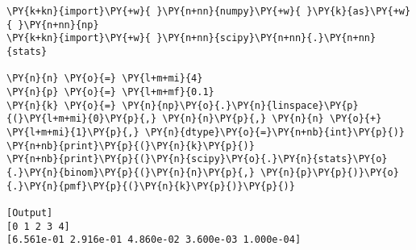 \begin{Verbatim}[label=\makebox{\href{https://github.com/unipi-physics-labs/statnotes/tree/main/snippy/scipy.stats.binom.py}{https://github.com/.../scipy.stats.binom.py}},commandchars=\\\{\}]
\PY{k+kn}{import}\PY{+w}{ }\PY{n+nn}{numpy}\PY{+w}{ }\PY{k}{as}\PY{+w}{ }\PY{n+nn}{np}
\PY{k+kn}{import}\PY{+w}{ }\PY{n+nn}{scipy}\PY{n+nn}{.}\PY{n+nn}{stats}

\PY{n}{n} \PY{o}{=} \PY{l+m+mi}{4}
\PY{n}{p} \PY{o}{=} \PY{l+m+mf}{0.1}
\PY{n}{k} \PY{o}{=} \PY{n}{np}\PY{o}{.}\PY{n}{linspace}\PY{p}{(}\PY{l+m+mi}{0}\PY{p}{,} \PY{n}{n}\PY{p}{,} \PY{n}{n} \PY{o}{+} \PY{l+m+mi}{1}\PY{p}{,} \PY{n}{dtype}\PY{o}{=}\PY{n+nb}{int}\PY{p}{)}
\PY{n+nb}{print}\PY{p}{(}\PY{n}{k}\PY{p}{)}
\PY{n+nb}{print}\PY{p}{(}\PY{n}{scipy}\PY{o}{.}\PY{n}{stats}\PY{o}{.}\PY{n}{binom}\PY{p}{(}\PY{n}{n}\PY{p}{,} \PY{n}{p}\PY{p}{)}\PY{o}{.}\PY{n}{pmf}\PY{p}{(}\PY{n}{k}\PY{p}{)}\PY{p}{)}

[Output]
[0 1 2 3 4]
[6.561e-01 2.916e-01 4.860e-02 3.600e-03 1.000e-04]
\end{Verbatim}
